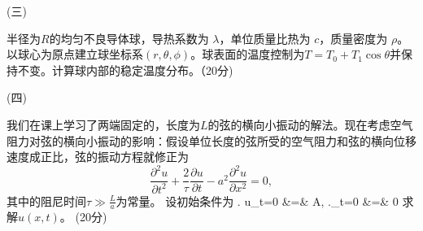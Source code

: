 \documentclass[12pt,CJK]{article}
\begin{document}
\item[(三)]{半径为$R$的均匀不良导体球，导热系数为 $\lambda$，单位质量比热为 $c$，质量密度为 $\rho$。以球心为原点建立球坐标系$(r,\theta,\phi)$。球表面的温度控制为$T = T_0+T_1 \cos\theta$并保持不变。计算球内部的稳定温度分布。（20分)

{\vskip 2in}
}

\item[(四)]{ 我们在课上学习了两端固定的，长度为$L$的弦的横向小振动的解法。现在考虑空气阻力对弦的横向小振动的影响：假设单位长度的弦所受的空气阻力和弦的横向位移速度成正比，弦的振动方程就修正为
  $$ \frac{\partial^2 u}{\partial t^2} + \frac{2}{\tau} \frac{\partial u}{\partial t}-  a^2\frac{\partial^2u }{\partial x^2} =  0 , $$
  其中的阻尼时间$\tau \gg \frac{L}{a}$为常量。
  设初始条件为
  \bea
  \left. u\right\vert_{t=0} &=& A, \newl
  \left.\right\vert_{t=0} &=& 0
  \eea
  求解$u(x,t)$。 (20分)

}

  
\eitem  





\ech
\end{document}
